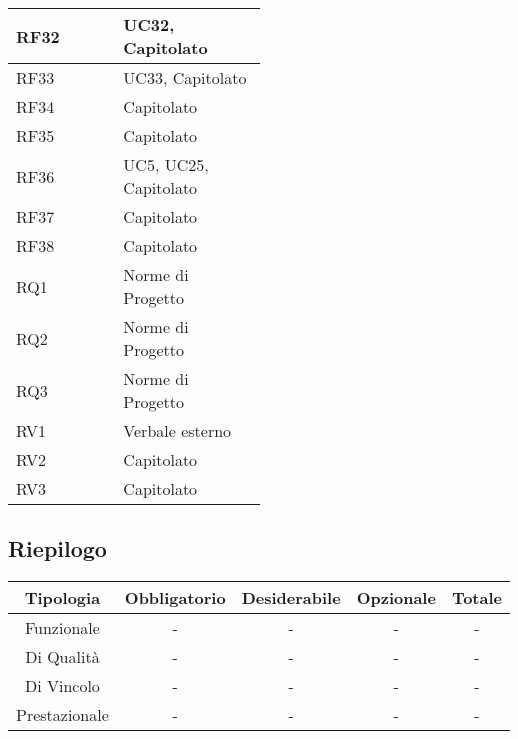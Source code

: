 \begin{center}
\begin{tabular}{ |p{0.25\linewidth}|p{0.25\linewidth}| }
		\hline
		RF32 & UC32, Capitolato \\
		\hline
		RF33 & UC33, Capitolato \\
		\hline
		RF34 & Capitolato \\
		\hline
		RF35 & Capitolato \\
		\hline
		RF36 & UC5, UC25, Capitolato \\
		\hline
		RF37 & Capitolato \\
		\hline
		RF38 & Capitolato \\
		\hline
		RQ1 & Norme di Progetto \\
		\hline
		RQ2 & Norme di Progetto \\
		\hline
		RQ3 & Norme di Progetto \\
		\hline
		RV1 & Verbale esterno \\
		\hline
		RV2 & Capitolato \\
		\hline
		RV3 & Capitolato \\
		\hline
	\end{tabular}
\end{center}

\subsection{Riepilogo}
\begin{center}

	\begin{tabular}{ |c|c|c|c|c| } 
		\hline
		\textbf{Tipologia} & \textbf{Obbligatorio} & \textbf{Desiderabile} & \textbf{Opzionale} & \textbf{Totale}\\
		\hline
		Funzionale & - & - & - & - \\
		\hline
		Di Qualità & - & - & - & - \\
		\hline
		Di Vincolo & - & - & - & - \\
		\hline
		Prestazionale & - & - & - & - \\
		\hline
	\end{tabular}

\end{center}
